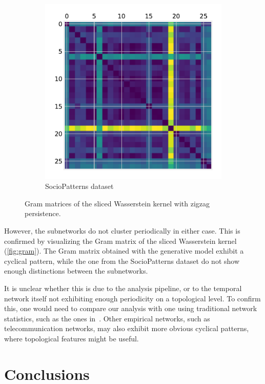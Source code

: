 \documentclass[a4paper,11pt,openany,extrafontsizes]{memoir}
\begin{document}
\begin{figure}[ht]
\begin{subfigure}[b]{0.45\linewidth}
    \includegraphics[width=\linewidth]{fig/sp_zz_gram1.pdf}
    \caption{SocioPatterns dataset}%
    \label{fig:gram_sp}
  \end{subfigure}
  \caption{Gram matrices of the sliced Wasserstein kernel with zigzag
    persistence.}%
  \label{fig:gram}
\end{figure}

However, the subnetworks do not cluster periodically in either
case. This is confirmed by visualizing the Gram matrix of the sliced
Wasserstein kernel (\autoref{fig:gram}). The Gram matrix obtained with
the generative model exhibit a cyclical pattern, while the one from
the SocioPatterns dataset do not show enough distinctions between the
subnetworks.

It is unclear whether this is due to the analysis pipeline, or to the
temporal network itself not exhibiting enough periodicity on a
topological level. To confirm this, one would need to compare our
analysis with one using traditional network statistics, such as the
ones in~\cite{jo_circadian_2012, aledavood_daily_2015,
  holme_network_2003, aledavood_digital_2015}. Other empirical
networks, such as telecommunication networks, may also exhibit more
obvious cyclical patterns, where topological features might be useful.

\chapter{Conclusions}%
\label{cha:conclusions}
\end{document}
